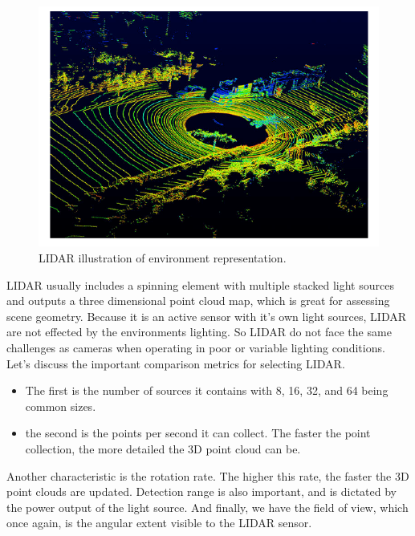 \begin{figure}[!htb]
\begin{center}
\includegraphics[scale=0.280]{img/hardware/lidar_illustrate.jpeg}
\end{center}
\caption{LIDAR illustration of environment representation.}
\label{lidar_illustrate}
\end{figure}

LIDAR usually includes a spinning element
with multiple stacked light sources and outputs a three dimensional
point cloud map, which is great for assessing scene geometry. Because it is an active sensor
with it's own light sources, LIDAR are not effected by
the environments lighting. So LIDAR do not face the same challenges
as cameras when operating in poor or variable lighting conditions. Let's discuss the important comparison
metrics for selecting LIDAR.

\begin{itemize}
\item The first is the number of sources it contains with 8, 16, 32, and 64 being common sizes. 
\item the second is the points per second it can collect. The faster the point collection, the more
detailed the 3D point cloud can be. 
\end{itemize}

Another characteristic is the rotation rate. The higher this rate, the faster
the 3D point clouds are updated. Detection range is also important, and is dictated by the power
output of the light source. And finally, we have the field of view,
which once again, is the angular extent
visible to the LIDAR sensor. 

